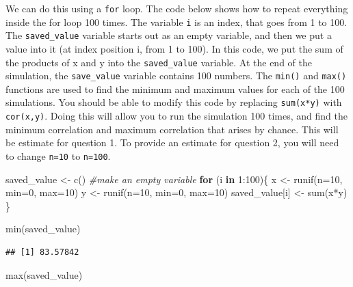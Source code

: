 \documentclass[
]{book}
\newenvironment{Shaded}{\begin{snugshade}}{\end{snugshade}}
\newcommand{\AttributeTok}[1]{\textcolor[rgb]{0.77,0.63,0.00}{#1}}
\newcommand{\CommentTok}[1]{\textcolor[rgb]{0.56,0.35,0.01}{\textit{#1}}}
\newcommand{\ControlFlowTok}[1]{\textcolor[rgb]{0.13,0.29,0.53}{\textbf{#1}}}
\newcommand{\DecValTok}[1]{\textcolor[rgb]{0.00,0.00,0.81}{#1}}
\newcommand{\FunctionTok}[1]{\textcolor[rgb]{0.00,0.00,0.00}{#1}}
\newcommand{\NormalTok}[1]{#1}
\newcommand{\OtherTok}[1]{\textcolor[rgb]{0.56,0.35,0.01}{#1}}
\newcommand{\SpecialCharTok}[1]{\textcolor[rgb]{0.00,0.00,0.00}{#1}}
\begin{document}
We can do this using a \texttt{for} loop. The code below shows how to repeat everything inside the for loop 100 times. The variable \texttt{i} is an index, that goes from 1 to 100. The \texttt{saved\_value} variable starts out as an empty variable, and then we put a value into it (at index position i, from 1 to 100). In this code, we put the sum of the products of x and y into the \texttt{saved\_value} variable. At the end of the simulation, the \texttt{save\_value} variable contains 100 numbers. The \texttt{min()} and \texttt{max()} functions are used to find the minimum and maximum values for each of the 100 simulations. You should be able to modify this code by replacing \texttt{sum(x*y)} with \texttt{cor(x,y)}. Doing this will allow you to run the simulation 100 times, and find the minimum correlation and maximum correlation that arises by chance. This will be estimate for question 1. To provide an estimate for question 2, you will need to change \texttt{n=10} to \texttt{n=100}.

\begin{Shaded}
\begin{Highlighting}[]
\NormalTok{saved\_value }\OtherTok{\textless{}{-}} \FunctionTok{c}\NormalTok{() }\CommentTok{\#make an empty variable}
\ControlFlowTok{for}\NormalTok{ (i }\ControlFlowTok{in} \DecValTok{1}\SpecialCharTok{:}\DecValTok{100}\NormalTok{)\{}
\NormalTok{  x }\OtherTok{\textless{}{-}} \FunctionTok{runif}\NormalTok{(}\AttributeTok{n=}\DecValTok{10}\NormalTok{, }\AttributeTok{min=}\DecValTok{0}\NormalTok{, }\AttributeTok{max=}\DecValTok{10}\NormalTok{)}
\NormalTok{  y }\OtherTok{\textless{}{-}} \FunctionTok{runif}\NormalTok{(}\AttributeTok{n=}\DecValTok{10}\NormalTok{, }\AttributeTok{min=}\DecValTok{0}\NormalTok{, }\AttributeTok{max=}\DecValTok{10}\NormalTok{)}
\NormalTok{  saved\_value[i] }\OtherTok{\textless{}{-}} \FunctionTok{sum}\NormalTok{(x}\SpecialCharTok{*}\NormalTok{y)}
\NormalTok{\}}

\FunctionTok{min}\NormalTok{(saved\_value)}
\end{Highlighting}
\end{Shaded}

\begin{verbatim}
## [1] 83.57842
\end{verbatim}

\begin{Shaded}
\begin{Highlighting}[]
\FunctionTok{max}\NormalTok{(saved\_value)}
\end{Highlighting}
\end{Shaded}
\end{document}
